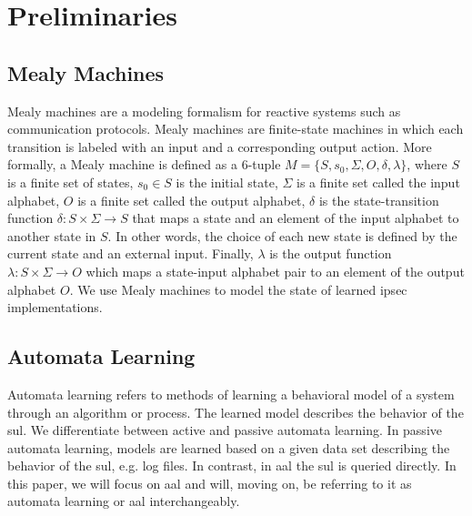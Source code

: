 %
%
% 

\chapter{Preliminaries}

\label{chap:Preliminaries}

\section{Mealy Machines}
Mealy machines are a modeling formalism for reactive systems such as communication protocols. Mealy machines are finite-state machines in which each transition is labeled with an input and a corresponding output action. More formally, a Mealy machine is defined as a 6-tuple $M = \{S, s_0, \Sigma, O, \delta, \lambda\}$, where $S$ is a finite set of states, $s_0 \in S$ is the initial state, $\Sigma$ is a finite set called the input alphabet, $O$ is a finite set called the output alphabet, $\delta$ is the state-transition function $\delta \colon S \times \Sigma \rightarrow S$ that maps a state and an element of the input alphabet to another state in $S$. In other words, the choice of each new state is defined by the current state and an external input. Finally, $\lambda$ is the output function $\lambda \colon S \times \Sigma \rightarrow O$ which maps a state-input alphabet pair to an element of the output alphabet $O$. We use Mealy machines to model the state of learned \ac{ipsec} implementations.

\section{Automata Learning}
Automata learning refers to methods of learning a behavioral model of a system through an algorithm or process. The learned model describes the behavior of the \ac{sul}. We differentiate between active and passive automata learning. In passive automata learning, models are learned based on a given data set describing the behavior of the \ac{sul}, e.g. log files. In contrast, in \acf{aal} the \ac{sul} is queried directly. In this paper, we will focus on \ac{aal} and will, moving on, be referring to it as automata learning or \ac{aal} interchangeably. 

